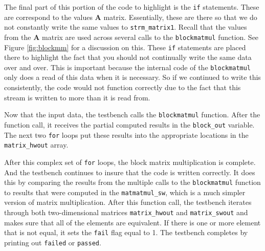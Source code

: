 The final part of this portion of the code to highlight is the \lstinline{if} statements. These are correspond to the values $\mathbf{A}$ matrix. Essentially, these are there so that we do not constantly write the same values to \lstinline{strm_matrix1}. Recall that the values from the $\mathbf{A}$ matrix are used across several calls to the \lstinline{blockmatmul} function. See Figure \ref{fig:blockmm} for a discussion on this. These \lstinline{if} statements are placed there to highlight the fact that you should not continually write the same data over and over. This is important because the internal code of the \lstinline{blockmatmul} only does a read of this data when it is necessary. So if we continued to write this consistently, the code would not function correctly due to the fact that this stream is written to more than it is read from.

Now that the input data, the testbench calls the \lstinline{blockmatmul} function. After the function call, it receives the partial computed results in the \lstinline{block_out} variable. The next two \lstinline{for} loops put these results into the appropriate locations in the \lstinline{matrix_hwout} array. 

After this complex set of \lstinline{for} loops, the block matrix multiplication is complete. And the testbench continues to insure that the code is written correctly. It does this by comparing the results from the multiple calls to the \lstinline{blockmatmul} function to results that were computed in the \lstinline{matmatmul_sw}, which is a much simpler version of matrix multiplication. After this function call, the testbench iterates through both two-dimensional matrices \lstinline{matrix_hwout} and \lstinline{matrix_swout} and makes sure that all of the elements are equivalent. If there is one or more element that is not equal, it sets the \lstinline{fail} flag equal to 1. The testbench completes by printing out \lstinline{failed} or \lstinline{passed}.

